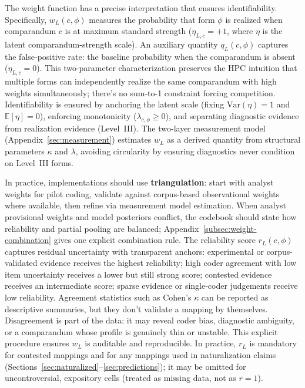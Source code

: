 \documentclass[12pt]{article}
\begin{document}
The weight function has a precise interpretation that ensures identifiability. Specifically, $w_L(c,\phi)$ measures the probability that form $\phi$ is realized when comparandum $c$ is at maximum standard strength ($\eta_{L,c}=+1$, where $\eta$ is the latent comparandum-strength scale). An auxiliary quantity $q_L(c,\phi)$ captures the false-positive rate: the baseline probability when the comparandum is absent ($\eta_{L,c}=0$). This two-parameter characterization preserves the HPC intuition that multiple forms can independently realize the same comparandum with high weights simultaneously; there's no sum-to-1 constraint forcing competition. Identifiability is ensured by anchoring the latent scale (fixing $\text{Var}(\eta)=1$ and $\mathbb{E}[\eta]=0$), enforcing monotonicity ($\lambda_{c,\phi} \geq 0$), and separating diagnostic evidence from realization evidence (Level~III). The two-layer measurement model (Appendix~\ref{sec:measurement}) estimates $w_L$ as a derived quantity from structural parameters $\kappa$ and $\lambda$, avoiding circularity by ensuring diagnostics never condition on Level~III forms.

In practice, implementations should use \textbf{triangulation}: start with analyst weights for pilot coding, validate against corpus-based observational weights where available, then refine via measurement model estimation. When analyst provisional weights and model posteriors conflict, the codebook should state how reliability and partial pooling are balanced; Appendix~\ref{subsec:weight-combination} gives one explicit combination rule. The reliability score $r_L(c,\phi)$ captures residual uncertainty with transparent anchors: experimental or corpus-validated evidence receives the highest reliability; high coder agreement with low item uncertainty receives a lower but still strong score; contested evidence receives an intermediate score; sparse evidence or single-coder judgements receive low reliability. Agreement statistics such as Cohen's $\kappa$ can be reported as descriptive summaries, but they don't validate a mapping by themselves. Disagreement is part of the data: it may reveal coder bias, diagnostic ambiguity, or a comparandum whose profile is genuinely thin or unstable. This explicit procedure ensures $w_L$ is auditable and reproducible. In practice, $r_L$ is mandatory for contested mappings and for any mappings used in naturalization claims (Sections~\ref{sec:naturalized}--\ref{sec:predictions}); it may be omitted for uncontroversial, expository cells (treated as missing data, not as $r=1$).
\end{document}
